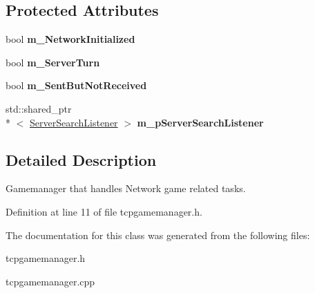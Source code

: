 \subsection*{Protected Attributes}
\begin{DoxyCompactItemize}
\item 
\hypertarget{class_t_c_p_game_manager_aabea99b1b4ed457eff4a5f0db194644b}{bool {\bfseries m\-\_\-\-Network\-Initialized}}\label{class_t_c_p_game_manager_aabea99b1b4ed457eff4a5f0db194644b}

\item 
\hypertarget{class_t_c_p_game_manager_a762b0b3ae60c0076165843b78d011927}{bool {\bfseries m\-\_\-\-Server\-Turn}}\label{class_t_c_p_game_manager_a762b0b3ae60c0076165843b78d011927}

\item 
\hypertarget{class_t_c_p_game_manager_ad973154be37079b7510d4ca3d66d47fb}{bool {\bfseries m\-\_\-\-Sent\-But\-Not\-Received}}\label{class_t_c_p_game_manager_ad973154be37079b7510d4ca3d66d47fb}

\item 
\hypertarget{class_t_c_p_game_manager_a15acfb9058bd60dbaad4a9561f643da3}{std\-::shared\-\_\-ptr\\*
$<$ \hyperlink{class_server_search_listener}{Server\-Search\-Listener} $>$ {\bfseries m\-\_\-p\-Server\-Search\-Listener}}\label{class_t_c_p_game_manager_a15acfb9058bd60dbaad4a9561f643da3}

\end{DoxyCompactItemize}


\subsection{Detailed Description}
Gamemanager that handles Network game related tasks. 

Definition at line 11 of file tcpgamemanager.\-h.



The documentation for this class was generated from the following files\-:\begin{DoxyCompactItemize}
\item 
tcpgamemanager.\-h\item 
tcpgamemanager.\-cpp\end{DoxyCompactItemize}
